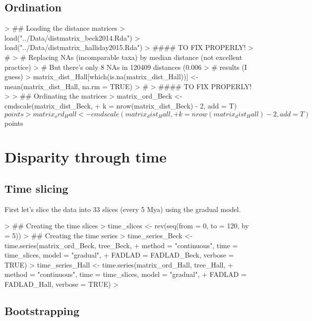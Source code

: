 \documentclass{article}
\begin{document}
\subsection{Ordination}

\begin{Schunk}
\begin{Sinput}
> ## Loading the distance matrices
> load("../Data/distmatrix_beck2014.Rda")
> load("../Data/distmatrix_halliday2015.Rda")
> #### TO FIX PROPERLY!
> #
> # Replacing NAs (incomparable taxa) by median distance (not excellent practice)
> # But there's only 8 NAs in 120409 distances (0.006%) so it won't influence the
> # results (I guess)
> matrix_dist_Hall[which(is.na(matrix_dist_Hall))] <- mean(matrix_dist_Hall, na.rm = TRUE)
> #
> #### TO FIX PROPERLY!
> 
> ## Ordinating the matrices
> matrix_ord_Beck <- cmdscale(matrix_dist_Beck,
+                             k = nrow(matrix_dist_Beck) - 2, add = T)$points
> matrix_ord_Hall <- cmdscale(matrix_dist_Hall,
+                             k = nrow(matrix_dist_Hall) - 2, add = T)$points
\end{Sinput}
\end{Schunk}

\section{Disparity through time}

\subsection{Time slicing}

First let's slice the data into 33 slices (every 5 Mya) using the gradual model.

\begin{Schunk}
\begin{Sinput}
> ## Creating the time slices
> time_slices <- rev(seq(from = 0, to = 120, by = 5))
> ## Creating the time series
> time_series_Beck <- time.series(matrix_ord_Beck, tree_Beck,
+     method = "continuous", time = time_slices, model = "gradual",
+     FADLAD = FADLAD_Beck, verbose = TRUE)
> time_series_Hall <- time.series(matrix_ord_Hall, tree_Hall,
+     method = "continuous", time = time_slices, model = "gradual",
+     FADLAD = FADLAD_Hall, verbose = TRUE)
> 
\end{Sinput}
\end{Schunk}

\subsection{Bootstrapping}
\end{document}
